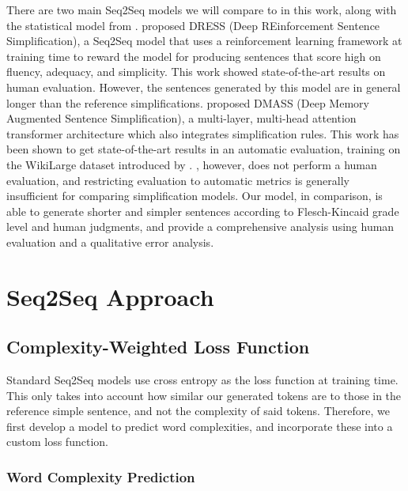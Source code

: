 \documentclass[11pt,a4paper]{article}
\begin{document}
There are two main Seq2Seq models we will compare to in this work, along with the statistical model from .  proposed DRESS (Deep REinforcement Sentence Simplification), a Seq2Seq model that uses a reinforcement learning framework at training time to reward the model for producing sentences that score high on fluency, adequacy, and simplicity. This work showed state-of-the-art results on human evaluation. However, the sentences generated by this model are in general longer than the reference simplifications.  proposed DMASS (Deep Memory Augmented Sentence Simplification), a multi-layer, multi-head attention transformer architecture which also integrates simplification rules. 
This work has been shown to get state-of-the-art results in an automatic evaluation, training on the WikiLarge dataset introduced by .
, however, does not perform a human evaluation, and restricting evaluation to automatic metrics is generally insufficient for comparing simplification models. 
Our model, in comparison, is able to generate shorter and simpler sentences according to Flesch-Kincaid grade level \cite{kincaid1975derivation} and human judgments, and provide a comprehensive analysis using human evaluation and a qualitative error analysis.

\section{Seq2Seq Approach} \label{methods}

\subsection{Complexity-Weighted Loss Function} \label{loss}

Standard Seq2Seq models use cross entropy as the loss function at training time. This only takes into account how similar our generated tokens are to those in the reference simple sentence, and not the complexity of said tokens. Therefore, we first develop a model to predict word complexities, and incorporate these into a custom loss function.

\subsubsection{Word Complexity Prediction} \label{word-comp-section}
\end{document}
